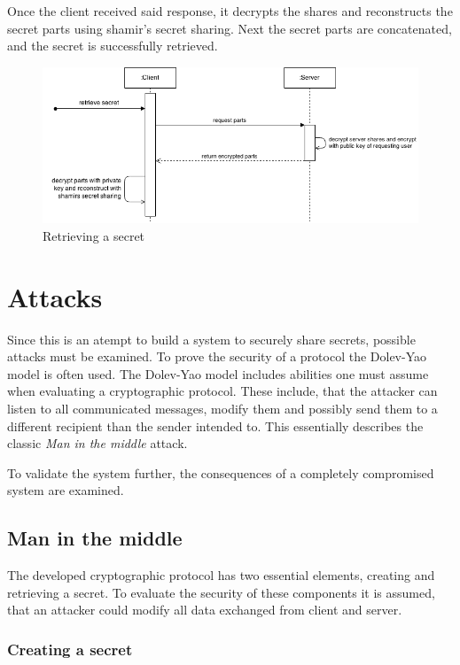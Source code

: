 Once the client received said response, it decrypts the shares and reconstructs
the secret parts using shamir's secret sharing. Next the secret parts are
concatenated, and the secret is successfully retrieved.

\begin{figure}
  \includegraphics[scale=0.55]{pictures/retrieve_secret_sequence_diagram.png}
  \caption{Retrieving a secret}
  \label{fig:retrieving_a_secret}
\end{figure}

\section{Attacks}

Since this is an atempt to build a system to securely share secrets, possible
attacks must be examined. To prove the security of a protocol the Dolev-Yao
model is often used. The Dolev-Yao model includes abilities one must assume
when evaluating a cryptographic protocol. These include, that the attacker can
listen to all communicated messages, modify them and possibly send them to a
different recipient than the sender intended to. This essentially describes the
classic \textit{Man in the middle} attack.

To validate the system further, the consequences of a completely compromised
system are examined.

\subsection{Man in the middle}

The developed cryptographic protocol has two essential elements, creating and
retrieving a secret. To evaluate the security of these components it is
assumed, that an attacker could modify all data exchanged from client and
server.

\subsubsection{Creating a secret}

